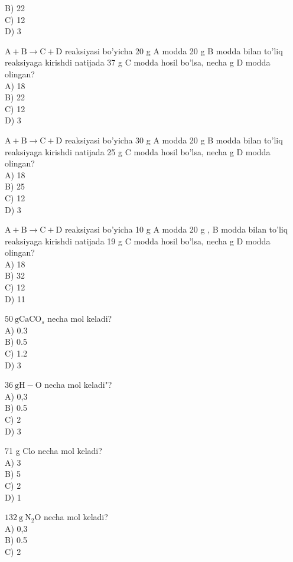 B) 22\\
C) 12\\
D) 3
  \item $\mathrm{A}+\mathrm{B} \rightarrow \mathrm{C}+\mathrm{D}$ reaksiyasi bo'yicha 20 g A modda 20 g B modda bilan to'liq reaksiyaga kirishdi natijada 37 g C modda hosil bo'lsa, necha g D modda olingan?\\
A) 18\\
B) 22\\
C) 12\\
D) 3
  \item $\mathrm{A}+\mathrm{B} \rightarrow \mathrm{C}+\mathrm{D}$ reaksiyasi bo'yicha 30 g A modda 20 g B modda bilan to'liq reaksiyaga kirishdi natijada 25 g C modda hosil bo'lsa, necha g D modda olingan?\\
A) 18\\
B) 25\\
C) 12\\
D) 3
  \item $\mathrm{A}+\mathrm{B} \rightarrow \mathrm{C}+\mathrm{D}$ reaksiyasi bo'yicha 10 g A modda 20 g , B modda bilan to'liq reaksiyaga kirishdi natijada 19 g C modda hosil bo'lsa, necha g D modda olingan?\\
A) 18\\
B) 32\\
C) 12\\
D) 11
  \item $50 \mathrm{~g} \mathrm{CaCO}_{s}$ necha mol keladi?\\
A) 0.3\\
B) 0.5\\
C) 1.2\\
D) 3\\
  \item $36 \mathrm{~g} \mathrm{H}-\mathrm{O}$ necha mol keladi"?\\
A) 0,3\\
B) 0.5\\
C) 2\\
D) 3
  \item 71 g Clo necha mol keladi?\\
A) 3\\
B) 5\\
C) 2\\
D) 1
  \item $132 \mathrm{~g} \mathrm{~N}_{2} \mathrm{O}$ necha mol keladi?\\
A) 0,3\\
B) 0.5\\
C) 2\\
